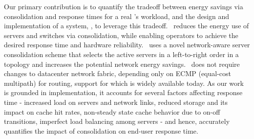 Our primary contribution is to quantify the tradeoff between energy savings via consolidation and response times for a real \cdc's workload, and the design and implementation of a system, \shrink, to leverage this tradeoff.
\shrink\ reduces the energy use of servers and switches via consolidation, while enabling operators to achieve the desired response time and hardware reliability. \shrink\ uses a novel network-aware server consolidation scheme that selects the active servers in a left-to-right order in a topology and increases the potential network energy savings. 
\shrink\ does not require changes to datacenter network fabric, depending only on ECMP (equal-cost multipath) for routing, support for which is widely available today.  As our work is grounded in implementation, it  accounts for several factors affecting response time - increased load on servers and network links, reduced storage and its impact on cache hit rates, non-steady state cache behavior due to on-off transitions, imperfect load balancing among servers - and hence, accurately quantifies the impact of consolidation on end-user response time.









